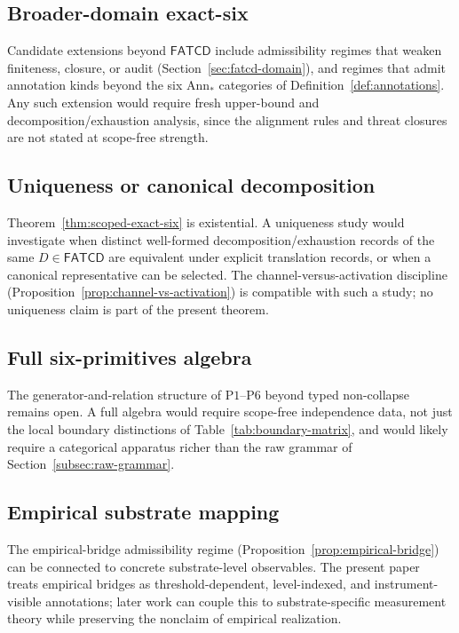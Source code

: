 \documentclass[11pt]{article}
\theoremstyle{definition}
\newcommand{\FATCD}{\ensuremath{\mathsf{FATCD}}}
\newcommand{\Pone}{\ensuremath{\mathrm{P1}}}
\newcommand{\Psix}{\ensuremath{\mathrm{P6}}}
\begin{document}
\subsection{Broader-domain exact-six}\label{subsec:future-broader-domain}

Candidate extensions beyond \FATCD{} include admissibility regimes
that weaken finiteness, closure, or audit
(Section~\ref{sec:fatcd-domain}), and regimes that admit annotation
kinds beyond the six \(\mathrm{Ann}_*\) categories of
Definition~\ref{def:annotations}. Any such extension would require
fresh upper-bound and decomposition/exhaustion analysis, since the
alignment rules and threat closures are not stated at scope-free
strength.

\subsection{Uniqueness or canonical decomposition}\label{subsec:future-uniqueness}

Theorem~\ref{thm:scoped-exact-six} is existential. A uniqueness study
would investigate when distinct well-formed decomposition/exhaustion
records of the same \(D \in \FATCD{}\) are equivalent under explicit
translation records, or when a canonical representative can be
selected. The channel-versus-activation discipline
(Proposition~\ref{prop:channel-vs-activation}) is compatible with
such a study; no uniqueness claim is part of the present theorem.

\subsection{Full six-primitives algebra}\label{subsec:future-algebra}

The generator-and-relation structure of \Pone{}--\Psix{} beyond
typed non-collapse remains open. A full algebra would require
scope-free independence data, not just the local boundary
distinctions of Table~\ref{tab:boundary-matrix}, and would likely
require a categorical apparatus richer than the raw grammar of
Section~\ref{subsec:raw-grammar}.

\subsection{Empirical substrate mapping}\label{subsec:future-substrate}

The empirical-bridge admissibility regime
(Proposition~\ref{prop:empirical-bridge}) can be connected to
concrete substrate-level observables. The present paper treats
empirical bridges as threshold-dependent, level-indexed, and
instrument-visible annotations; later work can couple this to
substrate-specific measurement theory while preserving the nonclaim
of empirical realization.
\end{document}

